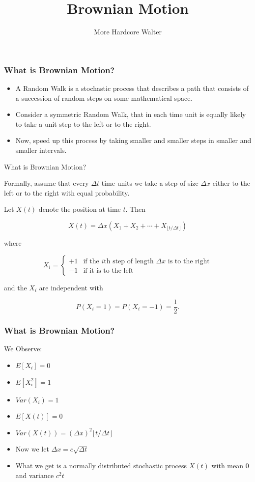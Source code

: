 \documentclass{beamer}
\title{Brownian Motion}
\author{More Hardcore Walter}
\begin{document}
	
	
	\begin{frame}
		\frametitle{What is Brownian Motion?}
		\begin{itemize}[<+->]
			\item A Random Walk is a stochastic process that describes a path that consists of a succession of random steps on some mathematical space. 
			\item Consider a symmetric Random Walk, that in each time unit is equally likely to take a unit step to the left or to the right. 
			\item Now, speed up this process by taking smaller and smaller steps in smaller and smaller intervals.
		\end{itemize}
	\end{frame}
	
	\begin{frame}{What is Brownian Motion?}
		
		Formally, assume that every $\Delta t$ time units we take a step 
		of size $\Delta x$ either to the left or to the right with equal probability.
		
		Let $X(t)$ denote the position at time $t$. Then
		
		\[
		X(t) = \Delta x \left(X_1 + X_2 + \cdots + X_{\lfloor t/\Delta t \rfloor}\right)
		\]
		
		where
		
		\[
		X_i =
		\begin{cases}
			+1 & \text{if the $i$th step of length $\Delta x$ is to the right} \\
			-1 & \text{if it is to the left}
		\end{cases}
		\]
		
		and the $X_i$ are independent with
		
		\[
		P(X_i = 1) = P(X_i = -1) = \frac{1}{2}.
		\]
		
	\end{frame}
	
	\begin{frame}
		\frametitle{What is Brownian Motion?}
		We Observe:
		\begin{itemize}[<+->]
			\item $E[X_i] = 0$
			\item $E[X_i^2] = 1$
			\item $Var(X_i) = 1$
			\item $E[X(t)] = 0$
			\item $Var(X(t)) = (\Delta x)^2 \lfloor t/\Delta t \rfloor$
			\item Now we let $\Delta x = c\sqrt{\Delta t}$
			\item What we get is a normally distributed stochastic process $X(t)$ with mean $0$ and variance $c^2 t$
		\end{itemize}
	\end{frame}
	
\end{document}
